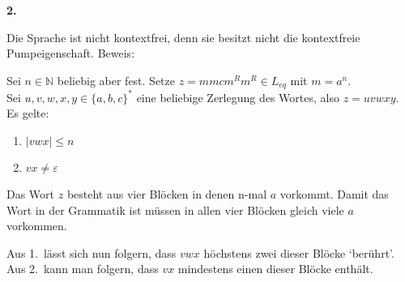 \begin{aufgabe}
\begin{teile}
    \textbf{2.}

    \item Die Sprache ist nicht kontextfrei, denn sie besitzt nicht die kontextfreie Pumpeigenschaft. Beweis:
    
    Sei $n \in \mathbb{N}$ beliebig aber fest. Setze $z = m m c m^R m^R \in L_{eq}$ mit $m = a^n$.
    \\Sei $u,v,w,x,y \in {\{a, b, c\}}^*$ eine beliebige Zerlegung des Wortes, also $z = uvwxy$.
    \\Es gelte:
    \begin{enumerate}
        \item $\vert vwx \vert \leq n$
        \item $vx \not= \varepsilon$
    \end{enumerate}
    Das Wort $z$ besteht aus vier Blöcken in denen n-mal $a$ vorkommt.
    Damit das Wort in der Grammatik ist müssen in allen vier Blöcken gleich viele $a$ vorkommen.

    Aus 1.\ lässt sich nun folgern, dass $vwx$ höchstens zwei dieser Blöcke `berührt'.
    \\Aus 2.\ kann man folgern, dass $vx$ mindestens einen dieser Blöcke enthält.


\end{teile}
\end{aufgabe}
